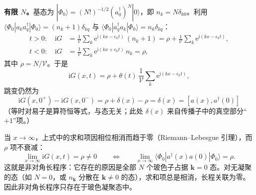 \textbf{有限 $N$。}基态为 $|\Phi_0\rangle=(N!)^{-1/2}(a_0^{\dagger})^{N}|0\rangle$，即 $n_k=N\delta_{k0}$。利用 $\langle\Phi_0|a_ka_q^{\dagger}|\Phi_0\rangle=(n_k+1)\delta_{kq}$ 与 $\langle\Phi_0|a_q^{\dagger}a_k|\Phi_0\rangle=n_k\delta_{kq}$：
\begin{align*}
t>0:\quad \mathrm{i}G&=\frac{1}{\mathcal{V}}\sum_k\mathrm{e}^{\mathrm{i}(kx-\epsilon_kt)}\,(n_k+1)
=\rho+\frac{1}{\mathcal{V}}\sum_k\mathrm{e}^{\mathrm{i}(kx-\epsilon_kt)},\\
t<0:\quad \mathrm{i}G&=\frac{1}{\mathcal{V}}\sum_k\mathrm{e}^{\mathrm{i}(kx+\epsilon_kt)}\,n_k=\rho ,
\end{align*}
其中 $\rho=N/\mathcal{V}$。于是
\begin{equation*}
\mathrm{i}G(x,t)=\rho+\theta(t)\,\frac{1}{\mathcal{V}}\sum_k\mathrm{e}^{\mathrm{i}(kx-\epsilon_kt)} ,
\end{equation*}
跳变仍然为
\begin{equation*}
\boxed{\;\mathrm{i}G(x,0^{+})-\mathrm{i}G(x,0^{-})=\rho+\delta(x)-\rho=\delta(x)=[a(x),a^{\dagger}(0)]\;}
\end{equation*}
（等时对易子是算符恒等式，与态无关；此处 $\delta(x)$ 来自传播子中的真空部分“$+1$”项。）

当 $x\to\infty$，上式中的求和项因相位相消而趋于零（Riemann--Lebesgue 引理），而 $\rho$ 项不衰减：
\begin{equation*}
\lim_{x\to\infty}\mathrm{i}G(x,t)=\rho\neq0
\qquad\Longleftrightarrow\qquad
\lim_{x\to\infty}\langle\Phi_0|a^{\dagger}(x)a(0)|\Phi_0\rangle=\rho .
\end{equation*}
这就是非对角长程序：它存在的原因是全部 $N$ 个玻色子占据 $\pmb{k}=0$ 态。对无凝聚的态（如 $N=0$，或 $n_{\pmb{k}}$ 分散在 $\pmb{k}\neq0$ 的态），求和项总是相消，长程关联为零。因此非对角长程序只存在于玻色凝聚态中。

